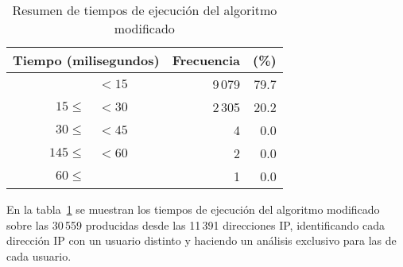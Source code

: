\begin{table}[htp]
\caption{Resumen de tiempos de ejecución del algoritmo modificado}
\begin{center}
\begin{tabular}{|r@{ $t$ }l|r|r|}
  \multicolumn{2}{c}{Tiempo (milisegundos)} & \multicolumn{1}{c}{Frecuencia} & \multicolumn{1}{c}{(\%)}\\\hline
            & $<15$ & 9\,079 & 79.7\\\hline
  $15\leq$  & $<30$ & 2\,305 & 20.2\\\hline
  $30\leq$  & $<45$ &      4 &  0.0\\\hline
  $145\leq$ & $<60$ &      2 &  0.0\\\hline
  $60\leq$  &       &      1 &  0.0\\\hline%
\end{tabular}
\end{center}
\label{tab:1-3-resumenTiemposEjecucionAlgoritmoModificado}
\end{table}%

En la tabla~\ref{tab:1-3-resumenTiemposEjecucionAlgoritmoModificado} se muestran los tiempos de ejecución del algoritmo modificado sobre las 30\,559 \transacciones producidas desde las 11\,391 direcciones IP, identificando cada dirección IP con un usuario distinto y haciendo un análisis exclusivo para las \transacciones de cada usuario.


